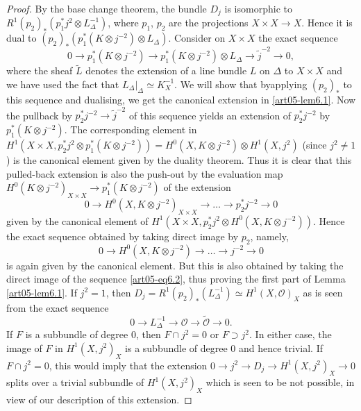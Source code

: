 \begin{proof}
By the base change theorem, the bundle $D_{j}$ is isomorphic to
$R^{1}(p_{2})_{*}(p^{*}_{1}j^{2}\otimes L^{-1}_{\Delta})$, where
$p_{1}$, $p_{2}$ are the projections $X\times X\to X$. Hence it is
dual to $(p_{2})_{*}(p^{*}_{1}(K\otimes j^{-2})\otimes
L_{\Delta})$. Consider on $X\times X$ the exact sequence
\setcounter{equation}{1}
\begin{equation}
0\to p^{*}_{1}(K\otimes j^{-2})\to p^{*}_{1}(K\otimes j^{-2})\otimes
L_{\Delta}\to \widetilde{j}^{-2}\to 0,\label{art05-eq6.2}
\end{equation}
where the sheaf $\widetilde{L}$ denotes the extension of a line bundle
$L$ on $\Delta$ to $X\times X$ and we have used the fact that
$L_{\Delta}|_{\Delta}\simeq K^{-1}_{X}$. We will show that
by\pageoriginale applying $(p_{2})_{*}$ to this sequence and
dualising, we get the canonical extension in \ref{art05-lem6.1}. Now
the pullback by $p^{*}_{2}j^{-2}\to \widetilde{j}^{-2}$ of this
sequence yields an extension of $p^{*}_{2}j^{-2}$ by
$p^{*}_{1}(K\otimes j^{-2})$. The corresponding element in
$H^{1}(X\times X,p^{*}_{2}j^{2}\otimes p^{*}_{1}(K\otimes
j^{-2}))=H^{0}(X,K\otimes j^{-2})\otimes H^{1}(X,j^{2})$ (since
$j^{2}\neq 1$) is the canonical element given by the duality
theorem. Thus it is clear that this pulled-back extension is also the
push-out by the evaluation map $H^{0}(K\otimes j^{-2})_{X\times X}\to
p^{*}_{1}(K\otimes j^{-2})$ of the extension
$$
0\to H^{0}(X,K\otimes j^{-2})_{X\times X}\to \ldots \to
p^{*}_{2}j^{-2}\to 0
$$
given by the canonical element of $H^{1}(X\times
X,p^{*}_{2}j^{2}\otimes H^{0}(X,K\otimes j^{-2}))$. Hence the exact
sequence obtained by taking direct image by $p_{2}$, namely,
$$
0\to H^{0}(X,K\otimes j^{-2})\to \ldots \to j^{-2}\to 0
$$
is again given by the canonical element. But this is also obtained by
taking the direct image of the sequence \eqref{art05-eq6.2}, thus
proving the first part of Lemma \ref{art05-lem6.1}. If $j^{2}=1$, then
$D_{j}=R^{1}(p_{2})_{*}(L^{-1}_{\Delta})\simeq
H^{1}(X,\mathscr{O})_{X}$ as is seen from the exact sequence
$$
0\to L^{-1}_{\Delta}\to \mathscr{O}\to \widetilde{\mathscr{O}}\to 0.
$$
If $F$ is a subbundle of degree 0, then $F\cap j^{2}=0$ or $F\supset
j^{2}$. In either case, the image of $F$ in $H^{1}(X,j^{2})_{X}$ is a
subbundle of degree 0 and hence trivial. If $F\cap j^{2}=0$, this
would imply that the extension $0\to j^{2}\to D_{j}\to
H^{1}(X,j^{2})_{X}\to 0$ splits over a trivial subbundle of
$H^{1}(X,j^{2})_{X}$ which is seen to be not possible, in view of our
description of this extension.
\end{proof}

